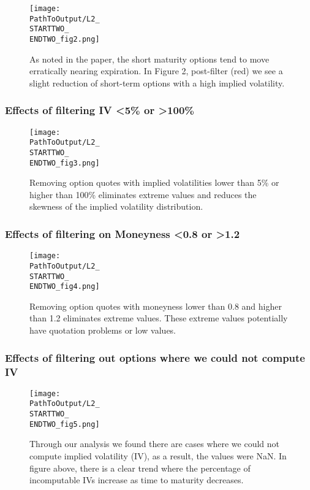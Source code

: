 \begin{appendix}
\begin{figure}[H] %
  \centering
  \texttt{[image: \\PathToOutput/L2\_\\STARTTWO\_\\ENDTWO\_fig2.png]}%
\captionsetup{font=normalfont}
  \caption{As noted in the paper, the short maturity options tend to move erratically nearing expiration. In Figure 2, post-filter (red) we see a slight reduction of short-term options with a high implied volatility.}
\label{fig:time2lvl2fig2}
\end{figure}

\subsubsection{Effects of filtering IV <5\% or >100\%}
\begin{figure}[H] %
  \centering
{}
  \texttt{[image: \\PathToOutput/L2\_\\STARTTWO\_\\ENDTWO\_fig3.png]}%
\captionsetup{font=normalfont}
  \caption{Removing option quotes with implied volatilities lower than 5\% or higher than 100\% eliminates extreme values and reduces the skewness of the implied volatility distribution.}
\label{fig:time2lvl2fig3}
\end{figure}


\subsubsection{Effects of filtering on Moneyness <0.8 or >1.2}
\begin{figure}[H] %
  \centering
{}
  \texttt{[image: \\PathToOutput/L2\_\\STARTTWO\_\\ENDTWO\_fig4.png]}%
\captionsetup{font=normalfont}
  \caption{Removing option quotes with moneyness lower than 0.8 and higher than 1.2 eliminates extreme values. These extreme values potentially have quotation problems or low values.}
  \label{fig:time2lvl2fig4}
\end{figure}


\subsubsection{Effects of filtering out options where we could not compute IV}
\begin{figure}[H] %
  \centering
{}
  \texttt{[image: \\PathToOutput/L2\_\\STARTTWO\_\\ENDTWO\_fig5.png]}%
\captionsetup{font=normalfont}
  \caption{Through our analysis we found there are cases where we could not compute implied volatility (IV), as a result, the values were NaN. In figure above, there is a clear trend where the percentage of incomputable IVs increase as time to maturity decreases.}
 \label{fig:time2lvl2fig5}
\end{figure}





\end{appendix}

